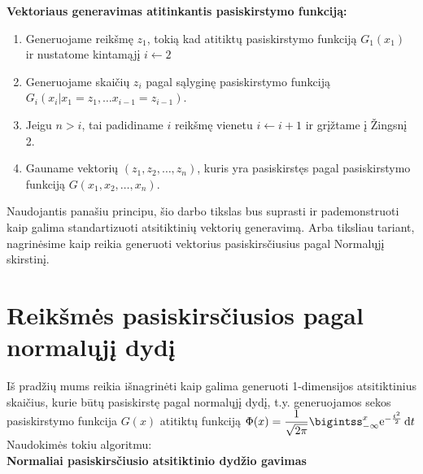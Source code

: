 \documentclass[12pt]{article}
\begin{document}
{\bf Vektoriaus generavimas atitinkantis pasiskirstymo funkciją:}

\begin{enumerate}
	
	\item Generuojame reikšmę $z_1$, tokią kad atitiktų pasiskirstymo funkciją $G_1(x_1)$ ir nustatome kintamąjį $i \longleftarrow 2$
	
	\item Generuojame skaičių $z_i$ pagal sąlyginę pasiskirstymo funkciją \\ $G_i(x_i | x_1=z_1, \ldots x_{i-1} = z_{i-1})$.
	
	\item Jeigu $n>i$, tai padidiname $i$ reikšmę vienetu $i \longleftarrow i+1$ ir grįžtame į Žingsnį 2.
	
	\item Gauname vektorių $(z_1,z_2, \ldots, z_n)$, kuris yra pasiskirstęs pagal pasiskirstymo funkciją $G(x_1, x_2, \ldots, x_n)$.
	
\end{enumerate}


Naudojantis panašiu principu, šio darbo tikslas bus suprasti ir pademonstruoti kaip galima standartizuoti atsitiktinių vektorių generavimą. Arba tiksliau tariant, nagrinėsime kaip reikia generuoti vektorius pasiskirsčiusius pagal Normalųjį skirstinį.


\section{Reikšmės pasiskirsčiusios pagal normalųjį dydį}

Iš pradžių mums reikia išnagrinėti kaip galima generuoti 1-dimensijos atsitiktinius skaičius, kurie būtų pasiskirstę pagal normalųjį dydį, t.y. generuojamos sekos pasiskirstymo funkcija $G(x)$ atitiktų funkciją $\Phi(x) = \dfrac{1}{\sqrt{2\pi}} \bigintss_{-\infty}^x \mathrm{e}^{-\frac{t^2}{2}}\,\mathrm{d}t $
Naudokimės tokiu algoritmu:\\


{\bf \label{alg:norm1} Normaliai pasiskirsčiusio atsitiktinio dydžio gavimas}
\end{document}
